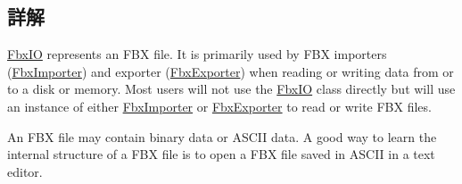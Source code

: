 \subsection{詳解}
\hyperlink{class_fbx_i_o}{Fbx\+IO} represents an F\+BX file. It is primarily used by F\+BX importers (\hyperlink{class_fbx_importer}{Fbx\+Importer}) and exporter (\hyperlink{class_fbx_exporter}{Fbx\+Exporter}) when reading or writing data from or to a disk or memory. Most users will not use the \hyperlink{class_fbx_i_o}{Fbx\+IO} class directly but will use an instance of either \hyperlink{class_fbx_importer}{Fbx\+Importer} or \hyperlink{class_fbx_exporter}{Fbx\+Exporter} to read or write F\+BX files.

An F\+BX file may contain binary data or A\+S\+C\+II data. A good way to learn the internal structure of a F\+BX file is to open a F\+BX file saved in A\+S\+C\+II in a text editor.

